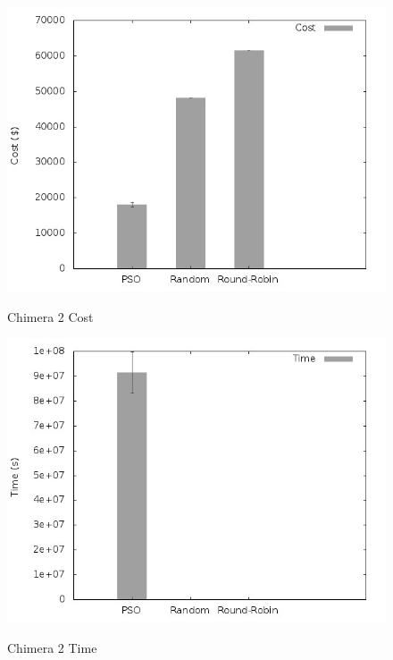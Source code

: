 \documentclass[a4paper,10pt]{article}
\begin{document}
\begin{figure}[!htb]

\centering

\includegraphics[scale=.55]{graphs/chimera2_cost.jpeg}
\label{chimera2_cost}
\caption{Chimera 2 Cost}

\includegraphics[scale=.55]{graphs/chimera2_time.jpeg}
\label{chimera2_time}
\caption{Chimera 2 Time}

\end{figure}
\end{document}
